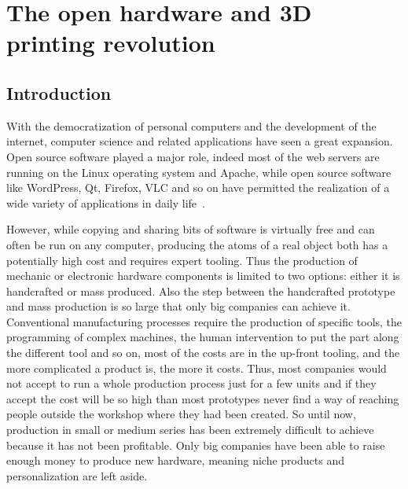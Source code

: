 
\cleartoleftpage


\chapter{The open hardware and 3D printing revolution}
\label{cha:3Dprint-OSH}



\section{Introduction} %

With the democratization of personal computers and the development of the internet, computer science and related applications have seen a great expansion. Open source software played a major role, indeed most of the web servers are running on the Linux operating system and Apache, while open source software like WordPress, Qt, Firefox, VLC and so on have permitted the realization of a wide variety of applications in daily life~\parencite{peeling2001analysis}.

However, while copying and sharing bits of software is virtually free and can often be run on any computer, producing the atoms of a real object both has a potentially high cost and requires expert tooling. Thus the production of mechanic or electronic hardware components is limited to two options: either it is handcrafted or mass produced. Also the step between the handcrafted prototype and mass production is so large that only big companies can achieve it. Conventional manufacturing processes require the production of specific tools, the programming of complex machines, the human intervention to put the part along the different tool and so on, most of the costs are in the up-front tooling, and the more complicated a product is, the more it costs. Thus, most companies would not accept to run a whole production process just for a few units and if they accept the cost will be so high than most prototypes never find a way of reaching people outside the workshop where they had been created. So until now, production in small or medium series has been extremely difficult to achieve because it has not been profitable.
Only big companies have been able to raise enough money to produce new hardware, meaning niche products and personalization are left aside.

